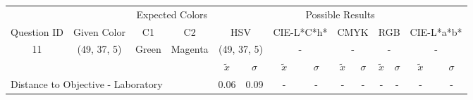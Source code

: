 \begin{table}[H]
  \resizebox{\textwidth}{!} {
  \begin{tabular}{lccccccccccccc}
    \hline
    \multicolumn{1}{c}{}                              &                                      & \multicolumn{2}{c}{Expected Colors}                   & \multicolumn{10}{c}{Possible Results}                                                                                                                                                                                                                                                                                        \\ \cline{3-14}
    \multicolumn{1}{c}{\multirow{-2}{*}{Question ID}} & \multirow{-2}{*}{Given Color}        & C1                       & C2                         & \multicolumn{2}{c}{HSV}                                        & \multicolumn{2}{c}{CIE-L*C*h*}                                 & \multicolumn{2}{c}{CMYK}                                       & \multicolumn{2}{c}{RGB}                                        & \multicolumn{2}{c}{CIE-L*a*b*}                                 \\ \hline
    \multicolumn{1}{c}{11}                             & \cellcolor[HTML]{FF8000}(49, 37, 5) & \multicolumn{1}{c|}{Green} & \multicolumn{1}{c|}{Magenta}  & \multicolumn{2}{c|}{\cellcolor[HTML]{FF8000}(49, 37, 5)}      & \multicolumn{2}{c|}{-}       & \multicolumn{2}{c|}{-}       & \multicolumn{2}{c|}{-}       & \multicolumn{2}{c|}{-}       \\ \hline
                                                      & \multicolumn{1}{l}{}                 & \multicolumn{1}{l}{}     & \multicolumn{1}{l}{}       & \multicolumn{1}{c}{$\tilde{x}$} & \multicolumn{1}{c}{$\sigma$} & \multicolumn{1}{c}{$\tilde{x}$} & \multicolumn{1}{c}{$\sigma$} & \multicolumn{1}{c}{$\tilde{x}$} & \multicolumn{1}{c}{$\sigma$} & \multicolumn{1}{c}{$\tilde{x}$} & \multicolumn{1}{c}{$\sigma$} & \multicolumn{1}{c}{$\tilde{x}$} & \multicolumn{1}{c}{$\sigma$} \\ \hline
    \multicolumn{4}{l}{Distance to Objective - Laboratory}                                                                                           & \multicolumn{1}{|c}{0.06}       & \multicolumn{1}{c|}{0.09}    & \multicolumn{1}{|c}{-}       & \multicolumn{1}{c|}{-}    & \multicolumn{1}{|c}{-}       & \multicolumn{1}{c|}{-}    & \multicolumn{1}{|c}{-}       & \multicolumn{1}{c|}{-}    & \multicolumn{1}{|c}{-}       & \multicolumn{1}{c|}{-}    \\

\end{tabular}}
\end{table}

